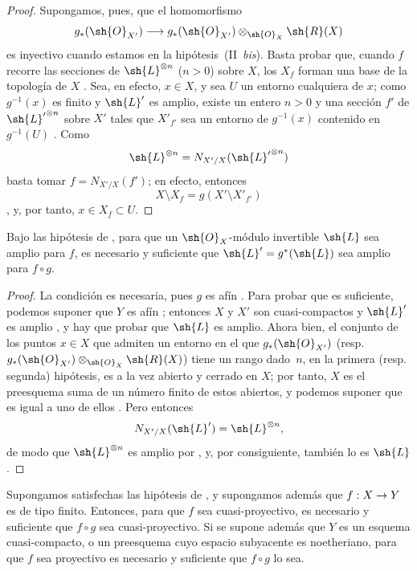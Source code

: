 \documentclass[oneside,10pt]{amsart}
\makeatletter
\newcommand{\ega@arrow}[2]{\mathchoice{#1}{#2}{#2}{#2}}
\renewcommand{\to}{\ega@arrow{\longrightarrow}{\rightarrow}}
\newcommand{\oldpage}[2][]{\marginnote{\normalfont\footnotesize\textbf{#1}~|~#2}\ignorespaces}
\let\EGAOriginalLabel\label
\renewcommand{\label}[1]{\phantomsection\EGAOriginalLabel{#1}}
\makeatother
\begin{document}
\begin{proof}
Supongamos, pues, que el homomorfismo
\[
  g_*(\sh{O}_{X'})\to
  g_*(\sh{O}_{X'})\otimes_{\sh{O}_X}\sh{R}(X)
\]
es inyectivo cuando estamos en la hipótesis~(II~\emph{bis}).
Basta probar que, cuando $f$ recorre las secciones de $\sh{L}^{\otimes n}$ ($n>0$) sobre $X$, los $X_f$ forman una base de la topología de $X$ .
Sea, en efecto, $x\in X$, y sea $U$ un entorno cualquiera de $x$;
como $g^{-1}(x)$ es finito  y $\sh{L}'$ es amplio, existe un entero $n>0$ y una sección $f'$ de ${\sh{L}'}^{\otimes n}$ sobre $X'$ tales que $X'_{f'}$ sea un entorno de $g^{-1}(x)$ contenido en $g^{-1}(U)$ .
Como
\[
  \sh{L}^{\otimes n}=N_{X'/X}({\sh{L}'}^{\otimes n})
\]
basta tomar $f=N_{X'/X}(f')$;
en efecto, entonces
\[
  X\setminus X_f=g(X'\setminus X'_{f'})
\]
, y, por tanto, $x\in X_f\subset U$.
\end{proof}

\begin{corollary}[6.6.3]
\label{II.6.6.3}
Bajo las hipótesis de , para que un $\sh{O}_X$-módulo invertible $\sh{L}$ sea amplio para $f$, es necesario y suficiente que $\sh{L}'=g^*(\sh{L})$ sea amplio para $f\circ g$.
\end{corollary}

\begin{proof}
La condición es necesaria, pues $g$ es afín .
Para probar que es suficiente, podemos suponer que $Y$ es afín ;
entonces $X$ y $X'$ son cuasi-compactos y $\sh{L}'$ es amplio , y hay que probar que $\sh{L}$ es amplio.
\oldpage[II]{132}
Ahora bien, el conjunto de los puntos $x\in X$ que admiten un entorno en el que $g_*(\sh{O}_{X'})$ (resp. $g_*(\sh{O}_{X'})\otimes_{\sh{O}_X}\sh{R}(X)$) tiene un rango dado~$n$, en la primera (resp. segunda) hipótesis, es a la vez abierto y cerrado en $X$;
por tanto, $X$ es el preesquema suma de un número finito de estos abiertos, y podemos suponer que es igual a uno de ellos .
Pero entonces
\[
  N_{X'/X}(\sh{L}')=\sh{L}^{\otimes n},
\]
de modo que $\sh{L}^{\otimes n}$ es amplio por , y, por consiguiente, también lo es $\sh{L}$ .
\end{proof}

\begin{corollary}[6.6.4]
\label{II.6.6.4}
Supongamos satisfechas las hipótesis de , y supongamos además que $f:X\to Y$ es de tipo finito.
Entonces, para que $f$ sea cuasi-proyectivo, es necesario y suficiente que $f\circ g$ sea cuasi-proyectivo.
Si se supone además que $Y$ es un esquema cuasi-compacto, o un preesquema cuyo espacio subyacente es noetheriano, para que $f$ sea proyectivo es necesario y suficiente que $f\circ g$ lo sea.
\end{corollary}
\end{document}
